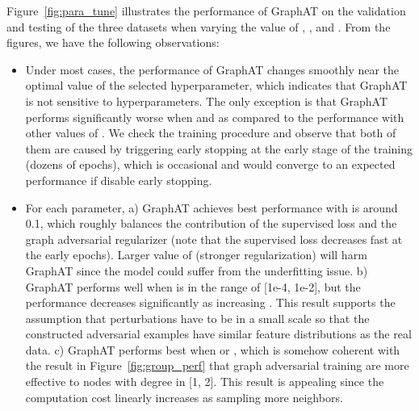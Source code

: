 \documentclass[10pt,journal,compsoc]{IEEEtran}
\begin{document}
Figure~\ref{fig:para_tune} illustrates the performance of GraphAT on the validation and testing of the three datasets when varying the value of , , and . From the figures, we have the following observations:
\begin{itemize}[leftmargin=*]
	\item Under most cases, the performance of GraphAT changes smoothly near the optimal value of the selected hyperparameter, which indicates that GraphAT is not sensitive to hyperparameters. The only exception is that GraphAT performs significantly worse when  and  as compared to the performance with other values of . We check the training procedure and observe that both of them are caused by triggering early stopping at the early stage of the training (dozens of epochs), which is occasional and would converge to an expected performance if disable early stopping.
	\item For each parameter, a) GraphAT achieves best performance with  is around 0.1, which roughly balances the contribution of the supervised loss and the graph adversarial regularizer (note that the supervised loss decreases fast at the early epochs). Larger value of  (stronger regularization) will harm GraphAT since the model could suffer from the underfitting issue. b) GraphAT performs well when  is in the range of [1e-4, 1e-2], but the performance decreases significantly as increasing . This result supports the assumption that perturbations have to be in a small scale so that the constructed adversarial examples have similar feature distributions as the real data. c) GraphAT performs best when  or , which is somehow coherent with the result in Figure~\ref{fig:group_perf} that graph adversarial training are more effective to nodes with degree in [1, 2]. This result is appealing since the computation cost linearly increases as sampling more neighbors.
\end{itemize}
\end{document}
